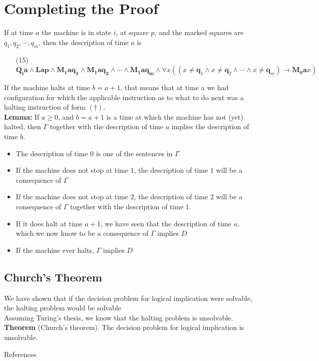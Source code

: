 \documentclass[
11pt,notheorems,hyperref={pdfauthor=whatever}
]{beamer}
\begin{document}
\section{Completing the Proof}
\begin{frame}
If at time $a$ the machine is in state $i$, at square $p$, and the marked squares are $q_1,q_2,\cdots,q_m$, then the description of time $a$ is
\vspace{1em}
\begin{enumerate}
    \item[(15)] $\pmb{Q_i a}\wedge\pmb{Lap}\wedge\pmb{M_1aq_1}\wedge\pmb{M_1aq_2}\wedge\cdots\wedge\pmb{M_1aq_m} \wedge \forall x((x\neq\pmb{q}_1\wedge x\neq\pmb{q}_2\wedge \cdots\wedge x\neq\pmb{q}_m)\to \pmb{M_0 a}x)$
\end{enumerate}
\vspace{1em}
If the machine halts at time $b = a + 1$, that means that at time a we had configuration for which the applicable instruction as to what to do next was a halting instruction of form $(\dagger)$.\\
\vspace{1em}
\textbf{Lemma:} If $a\ge0$, and $b = a+1$ is a time at which the machine has not (yet) halted, then $\Gamma$ together with the description of time $a$ implies the description of time $b$.
\vspace{1em}
\begin{itemize}
    \item The description of time $0$ is one of the sentences in $\Gamma$
    \item If the machine does not stop at time $1$, the description of time $1$ will be a consequence of $\Gamma$
    \item If the machine does not stop at time $2$, the description of time $2$ will be a consequence of $\Gamma$ together with the description of time $1$.
    \item If it does halt at time $a+1$, we have seen that the description of time $a$, which we now know to be a consequence of $\Gamma$ implies $D$
    \item If the machine ever halts, $\Gamma$ implies $D$
\end{itemize}
\end{frame}

\subsection{Church's Theorem}
\begin{frame}
    We have shown that if the decision problem for logical implication were solvable, the halting problem would be solvable\\
    \vspace{2em}
    Assuming Turing's thesis, we know that the halting problem is unsolvable.\\
    \vspace{5em}
    \textbf{Theorem} (Church’s theorem). The decision problem for logical implication is unsolvable.
\end{frame}

\begin{frame}[allowframebreaks]{References}
    \printbibliography
\end{frame}
\end{document}
